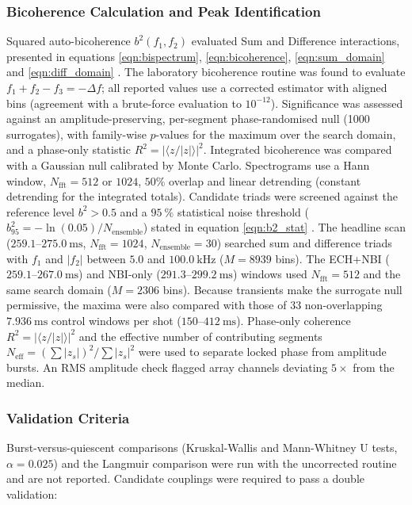 \subsubsection{Bicoherence Calculation and Peak Identification}
Squared auto-bicoherence $b^2(f_1, f_2)$ evaluated Sum and Difference interactions, presented in equations \ref{eqn:bispectrum}, \ref{eqn:bicoherence}, \ref{eqn:sum_domain} and \ref{eqn:diff_domain} \cite{Hou2019, Fujisawa2021}.
The laboratory bicoherence routine was found to evaluate $f_1+f_2-f_3=-\Delta f$; all reported values use a corrected estimator with aligned bins (agreement with a brute-force evaluation to $10^{-12}$). Significance was assessed against an amplitude-preserving, per-segment phase-randomised null (1000 surrogates), with family-wise $p$-values for the maximum over the search domain, and a phase-only statistic $R^2=|\langle z/|z|\rangle|^2$. Integrated bicoherence was compared with a Gaussian null calibrated by Monte Carlo. Spectrograms use a Hann window, $N_{\mathrm{fft}}=512$ or $1024$, $50\%$ overlap and linear detrending (constant detrending for the integrated totals).
Candidate triads were screened against the reference level $b^2 > 0.5$ \cite{Singh2024} and a $95~\%$ statistical noise threshold ($b^2_{95} = -\ln(0.05)/N_{\mathrm{ensemble}}$) stated in equation \ref{eqn:b2_stat} \cite{Hou2019, Fujisawa2021}.
The headline scan ($259.1\text{--}275.0~\mathrm{ms}$, $N_{\mathrm{fft}}=1024$, $N_{\mathrm{ensemble}}=30$) searched sum and difference triads with $f_1$ and $|f_2|$ between $5.0$ and $100.0~\mathrm{kHz}$ ($M=8939$ bins). The ECH+NBI ($259.1\text{--}267.0~\mathrm{ms}$) and NBI-only ($291.3\text{--}299.2~\mathrm{ms}$) windows used $N_{\mathrm{fft}}=512$ and the same search domain ($M=2306$ bins). Because transients make the surrogate null permissive, the maxima were also compared with those of 33 non-overlapping $7.936~\mathrm{ms}$ control windows per shot ($150\text{--}412~\mathrm{ms}$). Phase-only coherence $R^2=|\langle z/|z|\rangle|^2$ and the effective number of contributing segments $N_{\mathrm{eff}}=(\sum|z_s|)^2/\sum|z_s|^2$ were used to separate locked phase from amplitude bursts. An RMS amplitude check flagged array channels deviating $5\times$ from the median.

\subsubsection{Validation Criteria}
Burst-versus-quiescent comparisons (Kruskal-Wallis and Mann-Whitney U tests, $\alpha = 0.025$) \cite{shumway2017time, james2021statistical} and the Langmuir comparison were run with the uncorrected routine and are not reported. Candidate couplings were required to pass a double validation:

